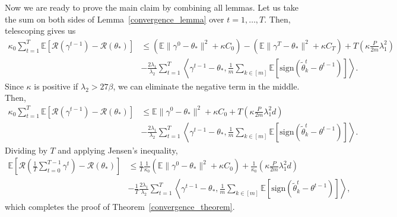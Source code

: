 \documentclass{article} %
\begin{document}
 Now we are ready to prove the main claim by combining all lemmas. Let us take the sum on both sides of Lemma~\ref{convergence_lemma} over $t=1, \ldots, T$. Then, telescoping gives us
\begin{align*}
    \kappa_0\sum_{t=1}^T\mathbb{E}[\mathcal{R}(\gamma^{t-1})-\mathcal{R}(\theta_*)]&\le (\mathbb{E}\lVert  \gamma^{0}-\theta_* \rVert^2+\kappa C_{0})-(\mathbb{E}\lVert \gamma^T -\theta_*\rVert^2+\kappa C_T)+T(\kappa\frac{P}{2m}\lambda_1^2)\\
    &-\frac{2\lambda_1}{\lambda_2 }\sum_{t=1}^T \left \langle \gamma^{t-1}-\theta_*,\frac{1}{m}\sum_{k\in [m]}\mathbb{E}[\mathrm{sign}(\tilde{\theta}_k^t-\theta^{t-1})] \right\rangle.
\end{align*}
Since $\kappa$ is positive if $\lambda_2>27\beta$, we can eliminate the negative term in the middle. Then,
\begin{align*}
    \kappa_0\sum_{t=1}^T\mathbb{E}[\mathcal{R}(\gamma^{t-1})-\mathcal{R}(\theta_*)]&\le \mathbb{E}\lVert  \gamma^{0}-\theta_* \rVert^2+\kappa C_{0}+T(\kappa\frac{P}{2m}\lambda_1^2d)\\
    &-\frac{2\lambda_1}{\lambda_2 } \sum_{t=1}^T\left\langle \gamma^{t-1}-\theta_*, \frac{1}{m}\sum_{k\in [m]} \mathbb{E}[\mathrm{sign}(\tilde{\theta}_k^t-\theta^{t-1})]\right\rangle.
\end{align*}
Dividing by $T$ and applying Jensen's inequality,
\begin{align}\label{summingresult}
    \mathbb{E} \left[ \mathcal{R}(\frac{1}{T}\sum_{t=0}^{T-1}\gamma^t)-\mathcal{R}(\theta_*) \right] &\le\frac{1}{T}\frac{1}{\kappa_0}(\mathbb{E}\lVert  \gamma^{0}-\theta_* \rVert^2+\kappa C_{0})+\frac{1}{\kappa_0}(\kappa\frac{P}{2m}\lambda_1^2d)\nonumber\\
    &-\frac{1}{T}\frac{2\lambda_1}{\lambda_2 }\sum_{t=1}^T\left\langle \gamma^{t-1}-\theta_*, \frac{1}{m}\sum_{k\in [m]}\mathbb{E}[\mathrm{sign}(\tilde{\theta}_k^t-\theta^{t-1})]\right\rangle,
\end{align}
which completes the proof of Theorem~\ref{convergence_theorem}.
\end{document}
